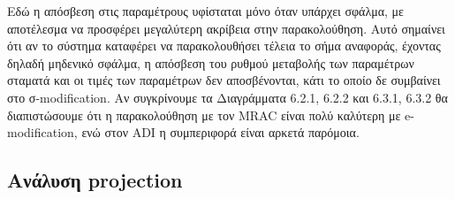 \documentclass{article}
\begin{document}
    \hfill\break
    Εδώ η απόσβεση στις παραμέτρους υφίσταται μόνο όταν υπάρχει σφάλμα, με αποτέλεσμα να προσφέρει μεγαλύτερη ακρίβεια στην παρακολούθηση. Αυτό σημαίνει ότι αν το σύστημα καταφέρει να παρακολουθήσει τέλεια το σήμα αναφοράς, έχοντας δηλαδή μηδενικό σφάλμα, η απόσβεση του ρυθμού μεταβολής των παραμέτρων σταματά και οι τιμές των παραμέτρων δεν αποσβένονται, κάτι το οποίο δε συμβαίνει στο σ-modification. Αν συγκρίνουμε τα Διαγράμματα 6.2.1, 6.2.2 και 6.3.1, 6.3.2 θα διαπιστώσουμε ότι η παρακολούθηση με τον MRAC είναι πολύ καλύτερη με e-modification, ενώ στον ADI η συμπεριφορά είναι αρκετά παρόμοια.
    
    \subsection{Ανάλυση projection}
    
    
    
\end{document}

